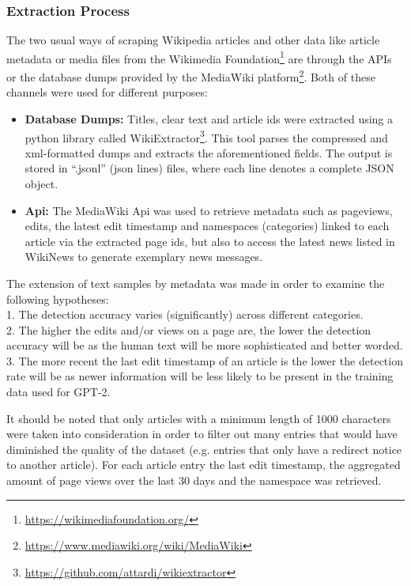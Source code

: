 \subsubsection{Extraction Process}
\label{sub:extraction_process}

The two usual ways of scraping Wikipedia articles and other data like article metadata or media files from the Wikimedia Foundation\footnote{\url{https://wikimediafoundation.org/}} are through the APIs or the database dumps provided by the MediaWiki platform\footnote{\url{https://www.mediawiki.org/wiki/MediaWiki}}.
Both of these channels were used for different purposes:\\
\begin{itemize}
    \item{\textbf{Database Dumps:}} Titles, clear text and article ids were extracted using a python library called WikiExtractor\footnote{\url{https://github.com/attardi/wikiextractor}}. This tool parses the compressed and xml-formatted dumps and extracts the aforementioned fields. The output is stored in “.jsonl” (json lines) files, where each line denotes a complete JSON object.
    \item{\textbf{Api:}} The MediaWiki Api was used to retrieve metadata such as pageviews, edits, the latest edit timestamp and namespaces (categories) linked to each article via the extracted page ids, but also to access the latest news listed in WikiNews to generate exemplary news messages.
\end{itemize}

The extension of text samples by metadata was made in order to examine the following hypotheses:\\
1. The detection accuracy varies (significantly) across different categories.\\
2. The higher the edits and/or views on a page are, the lower the detection accuracy will be as the human text will be more sophisticated and better worded.\\
3. The more recent the last edit timestamp of an article is the lower the detection rate will be as newer information will be less likely to be present in the training data used for GPT-2.

It should be noted that only articles with a minimum length of 1000 characters were taken into consideration in order to filter out many entries that would have diminished the quality of the dataset (e.g. entries that only have a redirect notice to another article). For each article entry the last edit timestamp, the aggregated amount of page views over the last 30 days and the namespace was retrieved.
